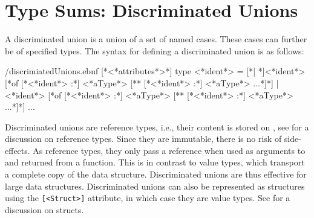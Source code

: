 \documentclass[fsharpNotes.tex]{subfiles}
\begin{document}
\begin{comment}
  \section{Enumerations}
\label{sec:enums}
\idx[enumerations]{Enumerations} or \idx{enums} for short are types with named values. Names in enums are assigned to a subset of integer or char values. Their syntax is as follows:
%
\begin{verbatimwrite}{\ebnf/enums.ebnf}
type <*ident*> = 
  [* | *] <*ident*> = <*integerOrChar*>
  | <*ident*> = <*integerOrChar*>
  | <*ident*> = <*integerOrChar*>
  ...
\end{verbatimwrite}
\syntax{\ebnf/enums.ebnf}{Syntax for enumerations.}
%
An example of using enumerations is given in \Cref{enum}.
%
\fs{enum}{An enum type acts as a typed alias to a set of integers or chars.}
%
In this example, we define an enumerated type for medals, which allows us to work with the names rather than the values. Since the values most often are arbitrary, we can program using semantically meaningful names instead. Being able to refer to an underlying integer type allows us to interface with other -- typically low-level -- programs that require integers, and to perform arithmetic. E.g., for the medal example, we can typecast the enumerated types to integers and calculate an average medal harvest.
\end{comment}

\section{Type Sums: Discriminated Unions}
\label{sec:discriminatedUnions}
A discriminated union is a union of a set of named cases. These cases can further be of specified types. The syntax for defining a discriminated union is as follows:
%
\begin{verbatimwrite}{\ebnf/discrimiatedUnions.ebnf}
[*<*attributes*>*] 
type <*ident*> = 
  [*| *]<*ident*> [*of [*<*ident*> :*] <*aType*> [** [*<*ident*> :*] <*aType*> ...*]*]
  | <*ident*> [*of [*<*ident*> :*] <*aType*> [** [*<*ident*> :*] <*aType*> ...*]*]
  ...
\end{verbatimwrite}
%
Discriminated unions are reference types, i.e., their content is stored on , see  for a discussion on reference types. Since they are immutable, there is no risk of side-effects. As reference types, they only pass a reference when used as arguments to and returned from a function. This is in contrast to value types, which transport a complete copy of the data structure. Discriminated unions are thus effective for large data structures. Discriminated unions can also be represented as structures using the \lstinline{[<Struct>]} attribute, in which case they are value types. See  for a discussion on structs.
\end{document}
